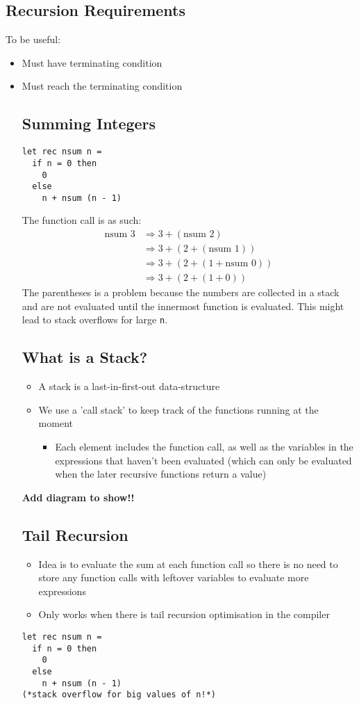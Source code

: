 \documentclass[12pt,a4paper]{article} %
\begin{document}
\subsection{Recursion Requirements}
To be useful:
\begin{itemize}
\item Must have terminating condition
\item Must reach the terminating condition
\subsection{Summing Integers}
\begin{lstlisting}[language=caml]
let rec nsum n =
  if n = 0 then
    0
  else
    n + nsum (n - 1)
\end{lstlisting}
The function call is as such:
\begin{align*}
\text{nsum } 3 &\Rightarrow 3+(\text{nsum }2)\\
&\Rightarrow3+(2+(\text{nsum }1))\\
&\Rightarrow3+(2+(1+\text{nsum }0))\\
&\Rightarrow3+(2+(1+0))
\end{align*}
The parentheses is a problem because the numbers are collected in a stack and are not evaluated until the innermost function is evaluated. This might lead to stack overflows for large \verb|n|.
\subsection{What is a Stack?}
\begin{itemize}
\item A stack is a last-in-first-out data-structure
\item We use a 'call stack' to keep track of the functions running at the moment
	\begin{itemize}
	\item Each element includes the function call, as well as the variables in the expressions that haven't been evaluated (which can only be evaluated when the later recursive functions return a value)
	\end{itemize}
\end{itemize}
\textbf{Add diagram to show!!}
\subsection{Tail Recursion}
\begin{itemize}
\item Idea is to evaluate the sum at each function call so there is no need to store any function calls with leftover variables to evaluate more expressions
\item Only works when there is tail recursion optimisation in the compiler
\end{itemize}
\begin{lstlisting}[language=caml]
let rec nsum n =
  if n = 0 then
    0
  else
    n + nsum (n - 1)
(*stack overflow for big values of n!*)    


\end{lstlisting}
\end{itemize}
\end{document}

